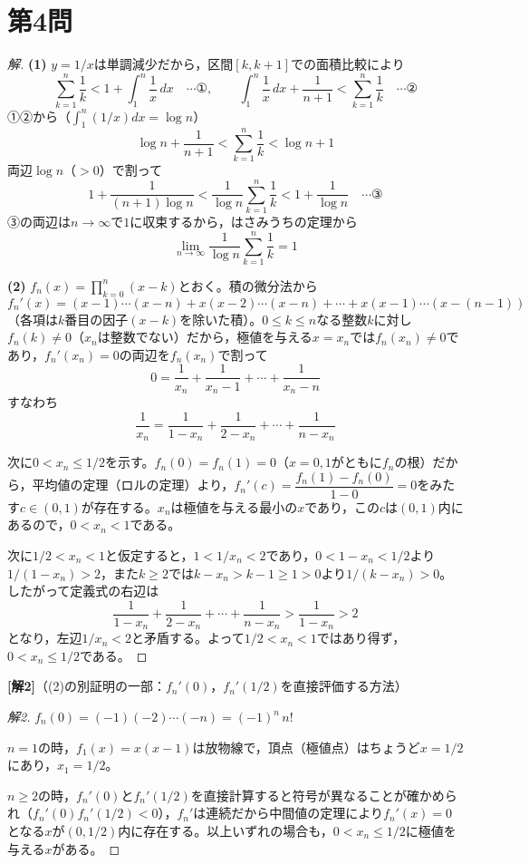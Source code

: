 \documentclass[../main.tex]{subfiles}
\begin{document}
\newpage

\section*{第4問}

\begin{proof}[解]
  \textbf{(1)} $y=1/x$は単調減少だから，区間$[k,k+1]$での面積比較により
  \[
    \sum_{k=1}^n\frac1k<1+\int_1^n\frac1x\,dx \quad\cdots\text{①}, \qquad
    \int_1^n\frac1x\,dx+\frac1{n+1}<\sum_{k=1}^n\frac1k \quad\cdots\text{②}
  \]
  ①②から（$\int_1^n(1/x)dx=\log n$）
  \[
    \log n+\frac1{n+1}<\sum_{k=1}^n\frac1k<\log n+1
  \]
  両辺$\log n$（$>0$）で割って
  \[
    1+\frac1{(n+1)\log n}<\frac1{\log n}\sum_{k=1}^n\frac1k<1+\frac1{\log n} \quad\cdots\text{③}
  \]
  ③の両辺は$n\to\infty$で$1$に収束するから，はさみうちの定理から
  \[
    \lim_{n\to\infty}\frac1{\log n}\sum_{k=1}^n\frac1k=1
  \]

  \textbf{(2)} $f_n(x)=\displaystyle\prod_{k=0}^n(x-k)$とおく。積の微分法から
  \[
    f_n'(x)=(x-1)\cdots(x-n)+x(x-2)\cdots(x-n)+\cdots+x(x-1)\cdots(x-(n-1))
  \]
  （各項は$k$番目の因子$(x-k)$を除いた積）。$0\le k\le n$なる整数$k$に対し$f_n(k)\ne0$（$x_n$は整数でない）だから，極値を与える$x=x_n$では$f_n(x_n)\ne0$であり，$f_n'(x_n)=0$の両辺を$f_n(x_n)$で割って
  \[
    0=\frac1{x_n}+\frac1{x_n-1}+\cdots+\frac1{x_n-n}
  \]
  すなわち
  \[
    \frac1{x_n}=\frac1{1-x_n}+\frac1{2-x_n}+\cdots+\frac1{n-x_n}
  \]

  次に$0<x_n\le1/2$を示す。$f_n(0)=f_n(1)=0$（$x=0,1$がともに$f_n$の根）だから，平均値の定理（ロルの定理）より，$f_n'(c)=\dfrac{f_n(1)-f_n(0)}{1-0}=0$をみたす$c\in(0,1)$が存在する。$x_n$は極値を与える最小の$x$であり，この$c$は$(0,1)$内にあるので，$0<x_n<1$である。

  次に$1/2<x_n<1$と仮定すると，$1<1/x_n<2$であり，$0<1-x_n<1/2$より$1/(1-x_n)>2$，また$k\ge2$では$k-x_n>k-1\ge1>0$より$1/(k-x_n)>0$。したがって定義式の右辺は
  \[
    \frac1{1-x_n}+\frac1{2-x_n}+\cdots+\frac1{n-x_n}>\frac1{1-x_n}>2
  \]
  となり，左辺$1/x_n<2$と矛盾する。よって$1/2<x_n<1$ではあり得ず，$0<x_n\le1/2$である。
\end{proof}

\bigskip
\noindent\textbf{[解2]}（(2)の別証明の一部：$f_n'(0)$，$f_n'(1/2)$を直接評価する方法）

\begin{proof}[解2]
  $f_n(0)=(-1)(-2)\cdots(-n)=(-1)^n\,n!$

  $n=1$の時，$f_1(x)=x(x-1)$は放物線で，頂点（極値点）はちょうど$x=1/2$にあり，$x_1=1/2$。

  $n\ge2$の時，$f_n'(0)$と$f_n'(1/2)$を直接計算すると符号が異なることが確かめられ（$f_n'(0)f_n'(1/2)<0$），$f_n'$は連続だから中間値の定理により$f_n'(x)=0$となる$x$が$(0,1/2)$内に存在する。以上いずれの場合も，$0<x_n\le1/2$に極値を与える$x$がある。
\end{proof}
\end{document}
